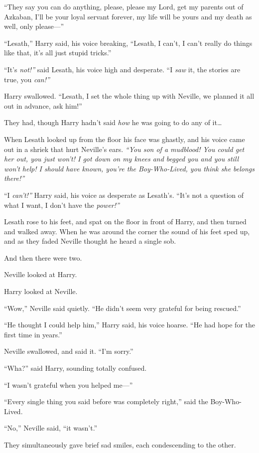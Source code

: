 ``They say you can do anything, please, please my Lord, get my parents
out of Azkaban, I'll be your loyal servant forever, my life will be
yours and my death as well, only please---''

``Lesath,'' Harry said, his voice breaking, ``Lesath, I can't, I can't
really do things like that, it's all just stupid tricks.''

``It's \emph{not!''} said Lesath, his voice high and desperate. ``I
\emph{saw} it, the stories are true, you \emph{can!''}

Harry swallowed. ``Lesath, I set the whole thing up with Neville, we
planned it all out in advance, ask him!''

They had, though Harry hadn't said \emph{how} he was going to do any of
it\ldots{}

When Lesath looked up from the floor his face was ghastly, and his voice
came out in a shriek that hurt Neville's ears. \emph{``You son of a
mudblood! You could get her out, you just won't! I got down on my knees
and begged you and you still won't help! I should have known, you're the
Boy-Who-Lived, you think she belongs there!''}

``I \emph{can't!''} Harry said, his voice as desperate as Lesath's.
``It's not a question of what I want, I don't have the \emph{power!''}

Lesath rose to his feet, and spat on the floor in front of Harry, and
then turned and walked away. When he was around the corner the sound of
his feet sped up, and as they faded Neville thought he heard a single
sob.

And then there were two.

Neville looked at Harry.

Harry looked at Neville.

``Wow,'' Neville said quietly. ``He didn't seem very grateful for being
rescued.''

``He thought I could help him,'' Harry said, his voice hoarse. ``He had
hope for the first time in years.''

Neville swallowed, and said it. ``I'm sorry.''

``Wha?'' said Harry, sounding totally confused.

``I wasn't grateful when you helped me---''

``Every single thing you said before was completely right,'' said the
Boy-Who-Lived.

``No,'' Neville said, ``it wasn't.''

They simultaneously gave brief sad smiles, each condescending to the
other.

